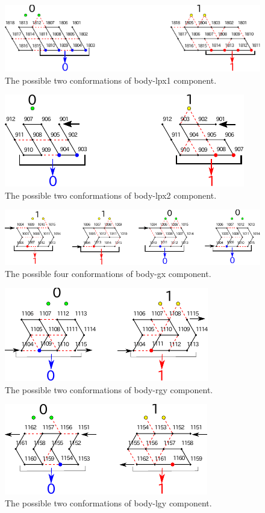\documentclass{article}
\theoremstyle{remark}
\begin{document}
\begin{figure}[h]
\centering
\includegraphics[width=0.8\linewidth]{body-lpx1.pdf}
\caption{The possible two conformations of body-lpx1 component.}
\label{fig:body-lpx1}
\end{figure}

\begin{figure}[h]
\centering
\includegraphics[width=0.55\linewidth]{body-lpx2.pdf}
\caption{The possible two conformations of body-lpx2 component.}
\label{fig:body-lpx2}
\end{figure}

\begin{figure}[h]
\centering
\includegraphics[width=\linewidth]{body-gx.pdf}
\caption{The possible four conformations of body-gx component.}
\label{fig:body-gx}
\end{figure}

\begin{figure}[h]
\centering
\includegraphics[width=0.5\linewidth]{body-rgy.pdf}
\caption{The possible two conformations of body-rgy component.}
\label{fig:body-rgy}
\end{figure}

\begin{figure}[h]
\centering
\includegraphics[width=0.5\linewidth]{body-lgy.pdf}
\caption{The possible two conformations of body-lgy component.}
\label{fig:body-lgy}
\end{figure}
\end{document}
